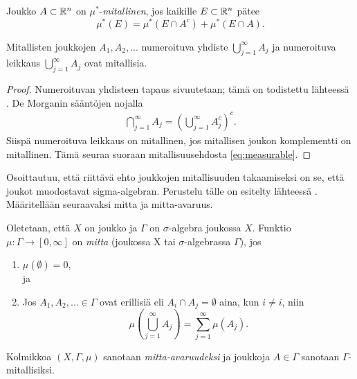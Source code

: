 \documentclass[12pt,oneside,a4paper]{amsbook} %
\begin{document}
\begin{definition}
    Joukko $A\subset \mathbb{R}^n$ on $\mu^*$-\textit{mitallinen}, jos kaikille $E\subset \mathbb{R}^n$ pätee
    \begin{equation}\label{eq:measurable}
        \mu^*(E) = \mu^*(E \cap A^c) + \mu^*(E\cap A).
    \end{equation}
\end{definition}

\begin{lemma}\label{le:countableUnionAndIntersectionIsMeas}
    Mitallisten joukkojen $A_1, A_2, ...$ numeroituva yhdiste $\bigcup_{j=1}^\infty A_j$ ja numeroituva leikkaus $\bigcup_{j=1}^\infty A_j$ ovat mitallisia.
\end{lemma}
\begin{proof}
    Numeroituvan yhdisteen tapaus sivuutetaan; tämä on todistettu lähteessä \cite[s. 94]{lehrbäck}.
    De Morganin sääntöjen nojalla
    \begin{align*}
        \bigcap_{j=1}^\infty A_j = \left(\bigcup_{j=1}^\infty A_j^c\right)^c.
    \end{align*}
    Siispä numeroituva leikkaus on mitallinen, jos mitallisen joukon komplementti on mitallinen. Tämä seuraa suoraan mitallisuusehdosta \eqref{eq:measurable}.
\end{proof}

Osoittautuu, että riittävä ehto joukkojen mitallisuuden takaamiseksi on se, että joukot muodostavat sigma-algebran. Perustelu tälle on esitelty lähteessä \cite[s. 79]{tao}. Määritellään seuraavaksi mitta ja mitta-avaruus.

\begin{definition}
    Oletetaan, että $X$ on joukko ja $\Gamma$ on $\sigma$-algebra joukossa $X$. Funktio $\mu : \Gamma \to [0, \infty]$ on \textit{mitta} (joukossa X tai $\sigma$-algebrassa $\Gamma$), jos 
    \begin{enumerate}
        \item $\mu(\emptyset) = 0$, \\
        ja
        \item Jos $A_1, A_2, ... \in \Gamma$ ovat erillisiä eli $A_i \cap A_j = \emptyset$ aina, kun $i \ne i$, niin
        $$\mu\left(\bigcup_{j=1}^\infty A_j \right) = \sum_{j=1}^\infty \mu(A_j).$$
    \end{enumerate}
    
    Kolmikkoa $(X,\Gamma, \mu)$ sanotaan \textit{mitta-avaruudeksi} ja joukkoja $A\in \Gamma$ sanotaan $\Gamma$-mitallisiksi.
    
\end{definition}
\end{document}
